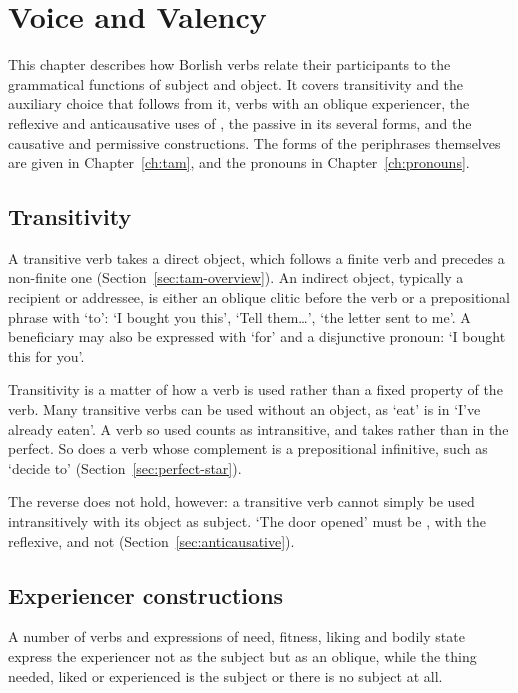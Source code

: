 \chapter{Voice and Valency}\label{ch:voice}

This chapter describes how Borlish verbs relate their participants to the grammatical functions of subject and object. It covers transitivity and the auxiliary choice that follows from it, verbs with an oblique experiencer, the reflexive and anticausative uses of , the passive in its several forms, and the causative and permissive constructions. The forms of the periphrases themselves are given in Chapter~\ref{ch:tam}, and the pronouns in Chapter~\ref{ch:pronouns}.

\section{Transitivity}\label{sec:transitivity}
A transitive verb takes a direct object, which follows a finite verb and precedes a non-finite one (Section~\ref{sec:tam-overview}). An indirect object, typically a recipient or addressee, is either an oblique clitic before the verb or a prepositional phrase with  `to':  `I bought you this',  `Tell them\ldots',  `the letter sent to me'. A beneficiary may also be expressed with  `for' and a disjunctive pronoun:  `I bought this for you'.

Transitivity is a matter of how a verb is used rather than a fixed property of the verb. Many transitive verbs can be used without an object, as  `eat' is in  `I've already eaten'. A verb so used counts as intransitive, and takes  rather than  in the perfect. So does a verb whose complement is a prepositional infinitive, such as  `decide to' (Section~\ref{sec:perfect-star}).

The reverse does not hold, however: a transitive verb cannot simply be used intransitively with its object as subject. `The door opened' must be , with the reflexive, and not  (Section~\ref{sec:anticausative}).

\section{Experiencer constructions}\label{sec:experiencers}
A number of verbs and expressions of need, fitness, liking and bodily state express the experiencer not as the subject but as an oblique, while the thing needed, liked or experienced is the subject or there is no subject at all.


